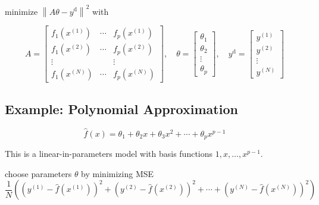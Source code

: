\begin{problem}
    minimize $ \left\|A \theta-y^{\mathrm{d}}\right\|^{2} $ with

\begin{equation}
A=\left[\begin{array}{ccc}
f_{1}\left(x^{(1)}\right) & \cdots & f_{p}\left(x^{(1)}\right) \\
f_{1}\left(x^{(2)}\right) & \cdots & f_{p}\left(x^{(2)}\right) \\
\vdots & & \vdots \\
f_{1}\left(x^{(N)}\right) & \cdots & f_{p}\left(x^{(N)}\right)
\end{array}\right], \quad \theta=\left[\begin{array}{c}
\theta_{1} \\
\theta_{2} \\
\vdots \\
\theta_{p}
\end{array}\right], \quad y^{\mathrm{d}}=\left[\begin{array}{c}
y^{(1)} \\
y^{(2)} \\
\vdots \\
y^{(N)}
\end{array}\right]
\end{equation}
\end{problem}



\subsection{Example: Polynomial Approximation}

\begin{problem}
    \begin{equation}
\hat{f}(x)=\theta_{1}+\theta_{2} x+\theta_{3} x^{2}+\cdots+\theta_{p} x^{p-1}
\end{equation}
\end{problem}

This is a linear-in-parameters model with basis functions $ 1, x, \ldots, x^{p-1} $.

\begin{problem}
    choose parameters $ \theta $ by minimizing MSE
\begin{equation}
\frac{1}{N}\left(\left(y^{(1)}-\hat{f}\left(x^{(1)}\right)\right)^{2}+\left(y^{(2)}-\hat{f}\left(x^{(2)}\right)\right)^{2}+\cdots+\left(y^{(N)}-\hat{f}\left(x^{(N)}\right)\right)^{2}\right)
\end{equation}
\end{problem}

